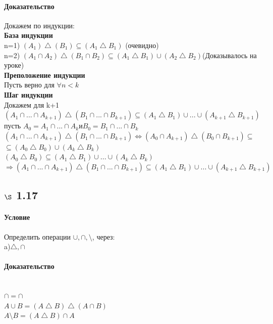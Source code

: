 \documentclass[a4paper,12pt]{article}
\begin{document}
\paragraph*{Доказательство}
Докажем по индукции:\\
\textbf{База индукции}\\
 n=1)  $(A_1) \bigtriangleup (B_1) \subseteq (A_1 \bigtriangleup B_1) $ (очевидно)\\
 n=2)  $(A_1 \cap  A_2) \bigtriangleup (B_1 \cap B_2) \subseteq (A_1 \bigtriangleup B_1) \cup (A_2 \bigtriangleup B_2) $(Доказывалось на уроке)\\
 \textbf{Преположение индукции}\\
 Пусть верно для $\forall n < k$\\
 \textbf{Шаг индукции}\\
 Докажем для k+1\\
 $(A_1 \cap ... \cap A_{k+1}) \bigtriangleup (B_1 \cap ... \cap B_{k+1}) \subseteq (A_1 \bigtriangleup B_1) \cup ... \cup (A_{k+1} \bigtriangleup B_{k+1}) $\\
 пусть $ A_0 = A_1 \cap ... \cap A_k и B_0 = B_1 \cap ... \cap B_k$\\
 $(A_1 \cap ... \cap A_{k+1}) \bigtriangleup (B_1 \cap ... \cap B_{k+1}) \Leftrightarrow (A_0 \cap A_{k+1}) \bigtriangleup (B_0 \cap B_{k+1}) \subseteq $ \\
$ \subseteq (A_0 \bigtriangleup B_0) \cup (A_k \bigtriangleup B_k)$\\
$(A_0 \bigtriangleup B_0) \subseteq  (A_1 \bigtriangleup B_1) \cup ... \cup (A_k \bigtriangleup B_k)$\\
$\Rightarrow (A_1 \cap ... \cap A_{k+1}) \bigtriangleup (B_1 \cap ... \cap B_{k+1}) \subseteq (A_1 \bigtriangleup B_1) \cup ... \cup (A_{k+1} \bigtriangleup B_{k+1}) $\\

\subsection*{$\S$ 1.17}
\paragraph*{Условие}
Определить операции $ \cup,  \cap,  \setminus$, через:\\
a)$\bigtriangleup, \cap$
\paragraph*{Доказательство} \mbox{}\\
$\cap = \cap $\\
$ A \cup B = (A \bigtriangleup B) \bigtriangleup ( A \cap B)$\\
$ A \setminus B =  (A \bigtriangleup B) \cap A$
\end{document}
